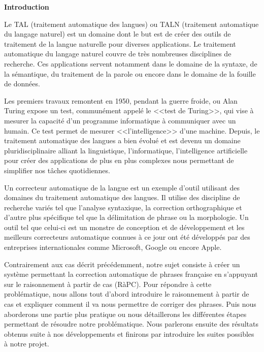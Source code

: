 \documentclass{article}
\begin{document}
\cleardoublepage


\begin{center}
{\bfseries \huge Introduction}
\end{center}

\vspace*{35mm}


Le TAL (traitement automatique des langues) ou TALN (traitement automatique du langage naturel) est un domaine dont le but est de cr\'eer des outils de traitement de la langue naturelle pour diverses applications. Le traitement automatique du langage naturel couvre de tr\`{e}s nombreuses disciplines de recherche. Ces applications servent notamment dans le domaine de la syntaxe, de la s\'emantique, du traitement de la parole ou encore dans le domaine de la fouille de donn\'ees.
\newline

Les premiers travaux remontent en 1950, pendant la guerre froide, ou Alan Turing expose un test, commun\'ement appel\'e le <<test de Turing>>, qui vise \`{a} mesurer la capacit\'e d'un programme informatique \`{a} communiquer avec un humain. Ce test permet de mesurer <<l'intelligence>> d'une machine. Depuis, le traitement automatique des langues a bien \'evolu\'e et est devenu un domaine pluridisciplinaire alliant la linguistique, l'informatique, l'intelligence artificielle pour cr\'eer des applications de plus en plus complexes nous permettant de simplifier nos t\^aches quotidiennes. 
\newline

Un correcteur automatique de la langue est un exemple d'outil utilisant des domaines du traitement automatique des langues. Il utilise des discipline de recherche vari\'es tel que l'analyse syntaxique, la correction orthographique et d'autre plus sp\'ecifique tel que la d\'elimitation de phrase ou la morphologie. Un outil tel que celui-ci est un monstre de conception et de d\'eveloppement et les meilleurs correcteurs automatique connues \`{a} ce jour ont \'et\'e d\'evelopp\'es par des entreprises internationales comme Microsoft, Google ou encore Apple. 
\newline

Contrairement aux cas d\'ecrit pr\'ec\'edemment, notre sujet consiste \`{a} cr\'eer un syst\`{e}me permettant la correction automatique de phrases française en s'appuyant sur le raisonnement \`{a} partir de cas (R\`{a}PC). Pour r\'epondre \`{a} cette probl\'ematique, nous allons tout d'abord introduire le raisonnement \`{a} partir de cas et expliquer comment il va nous permettre de corriger des phrases. Puis nous aborderons une partie plus pratique ou nous d\'etaillerons les diff\'erentes \'etapes permettant de r\'esoudre notre probl\'ematique. Nous parlerons ensuite des r\'esultats obtenus suite \`{a} nos d\'eveloppements et finirons par introduire les suites possibles \`{a} notre projet.

\cleardoublepage
\end{document}

